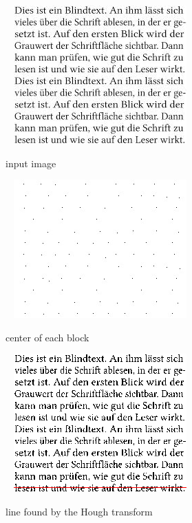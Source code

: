 \begin{figure}[h!]\
    \centering
    \includegraphics[scale=1]{chapters/Pictures/hough3.jpg}
    \caption{input image}
\end{figure}
\begin{figure}[h!]\
    \centering
    \includegraphics[scale=1]{chapters/Pictures/hough4.jpg}
    \caption{center of each block}
\end{figure}
\begin{figure}[h!]\
    \centering
    \includegraphics[scale=1]{chapters/Pictures/hough5.png}
    \caption{line found by the Hough transform}
\end{figure}
